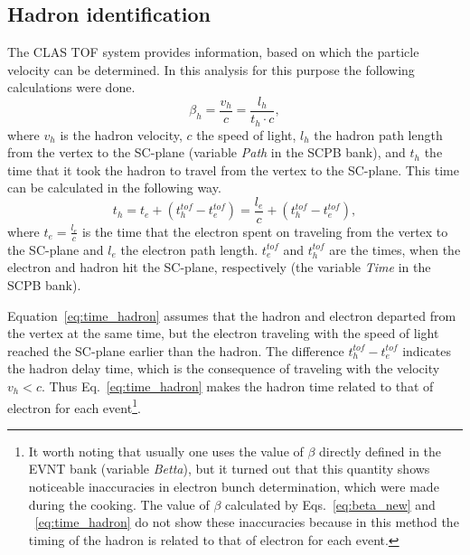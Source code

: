 

\subsection{Hadron identification}
\label{Sect:hadr_id}

The CLAS TOF system provides information, based on which the particle velocity can be determined. In this analysis for this purpose the following calculations were done.
\begin{equation}
\beta_{h} =\frac{v_{h}}{c}=\frac{l_{h}}{t_{h}\cdot c},
\label{eq:beta_new}
\end{equation}
where $v_{h}$ is the hadron velocity, $c$ the speed of light, $l_{h}$ the hadron path length from the vertex to the SC-plane (variable \textit{Path} in the SCPB bank), and $t_{h}$ the time that it took the hadron to travel from the vertex to the SC-plane. This time can be calculated in the following way. 
\begin{equation}
t_{h} = t_{e} + (t^{tof}_{h}- t^{tof}_{e}) = \frac{l_{e}}{c} + (t^{tof}_{h}- t^{tof}_{e})  ,
\label{eq:time_hadron}
\end{equation}
where $t_{e} = \frac{l_{e}}{c}$ is the time that the electron spent on traveling from the vertex to the SC-plane and $l_{e}$ the electron path length. $t^{tof}_{e}$ and $t^{tof}_{h}$ are the times, when the electron and hadron hit the SC-plane, respectively (the variable \textit{Time} in the SCPB bank).

Equation~\eqref{eq:time_hadron} assumes that the hadron and electron departed from the vertex at the same time, but the electron traveling with the speed of light reached the SC-plane earlier than the hadron. The difference $t^{tof}_{h} - t^{tof}_{e}$ indicates the hadron delay time, which is the consequence of traveling with the velocity $v_{h}<c$. Thus Eq.~\eqref{eq:time_hadron} makes the hadron time related to that of electron for each event\footnote[5]{It worth noting that usually one uses the value of $\beta$ directly defined in the EVNT bank (variable \textit{Betta}), but it turned out that this quantity shows noticeable inaccuracies in electron bunch determination, which were made during the cooking. The value of $\beta$ calculated by Eqs.~\eqref{eq:beta_new} and ~\eqref{eq:time_hadron} do not show these inaccuracies because in this method the timing of the hadron is related to that of electron for each event. }.  


